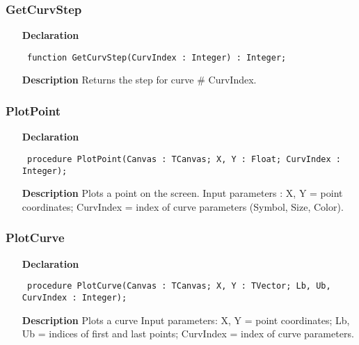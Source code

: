 \documentclass[12pt,a4paper,oneside]{report}
\newcommand{\declarationitem}[1]{\textbf{#1}}
\newcommand{\descriptiontitle}[1]{\textbf{#1}}
\newcommand{\code}[1]{\texttt{#1}}
\begin{document}
\subsubsection{GetCurvStep}
\label{uwinplot-GetCurvStep}
\begin{itemize}\item[\declarationitem{Declaration}\hfill]
	\begin{flushleft}
		\code{
			function GetCurvStep(CurvIndex : Integer) : Integer;}
		
	\end{flushleft}
	
	\par
	\item[\descriptiontitle{Description}]
	Returns the step for curve {\#} CurvIndex.
	
\end{itemize}
\subsubsection{PlotPoint}
\label{uwinplot-PlotPoint}
\begin{itemize}\item[\declarationitem{Declaration}\hfill]
	\begin{flushleft}
		\code{
			procedure PlotPoint(Canvas : TCanvas; X, Y : Float; CurvIndex : Integer);}
		
	\end{flushleft}
	
	\par
	\item[\descriptiontitle{Description}]
	Plots a point on the screen. Input parameters : X, Y = point coordinates; CurvIndex = index of curve parameters (Symbol, Size, Color).
	
\end{itemize}
\subsubsection{PlotCurve}
\label{uwinplot-PlotCurve}
\begin{itemize}\item[\declarationitem{Declaration}\hfill]
	\begin{flushleft}
		\code{
			procedure PlotCurve(Canvas : TCanvas; X, Y : TVector; Lb, Ub, CurvIndex : Integer);}
		
	\end{flushleft}
	
	\par
	\item[\descriptiontitle{Description}]
	Plots a curve Input parameters: X, Y = point coordinates; Lb, Ub = indices of first and last points; CurvIndex = index of curve parameters.
	
\end{itemize}
\end{document}

